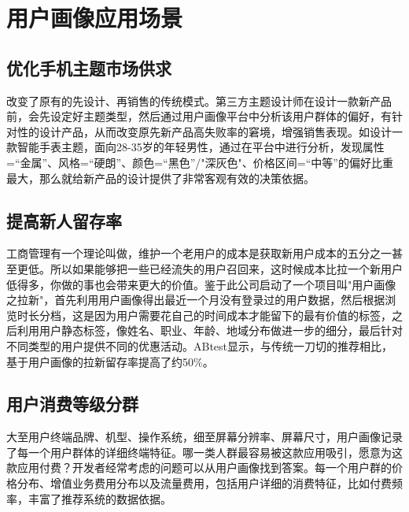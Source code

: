         \begin{figure}
        \centering
          \label{pic:hl_usergroup}
        \end{figure}


    \section{用户画像应用场景}
      \subsection{优化手机主题市场供求}
      改变了原有的先设计、再销售的传统模式。第三方主题设计师在设计一款新产品前，会先设定好主题类型，然后通过用户画像平台中分析该用户群体的偏好，有针对性的设计产品，从而改变原先新产品高失败率的窘境，增强销售表现。如设计一款智能手表主题，面向28-35岁的年轻男性，通过在平台中进行分析，发现属性=“金属”、风格=“硬朗”、颜色=“黑色”/"深灰色"、价格区间=“中等”的偏好比重最大，那么就给新产品的设计提供了非常客观有效的决策依据。
      \subsection{提高新人留存率}
      工商管理有一个理论叫做，维护一个老用户的成本是获取新用户成本的五分之一甚至更低。所以如果能够把一些已经流失的用户召回来，这时候成本比拉一个新用户低得多，你做的事也会带来更大的价值。鉴于此公司启动了一个项目叫"用户画像之拉新"，首先利用用户画像得出最近一个月没有登录过的用户数据，然后根据浏览时长分档，这是因为用户需要花自己的时间成本才能留下的最有价值的标签，之后利用用户静态标签，像姓名、职业、年龄、地域分布做进一步的细分，最后针对不同类型的用户提供不同的优惠活动。ABtest显示，与传统一刀切的推荐相比，基于用户画像的拉新留存率提高了约50\%。
      \subsection{用户消费等级分群}
      大至用户终端品牌、机型、操作系统，细至屏幕分辨率、屏幕尺寸，用户画像记录了每一个用户群体的详细终端特征。哪一类人群最容易被这款应用吸引，愿意为这款应用付费？开发者经常考虑的问题可以从用户画像找到答案。每一个用户群的价格分布、增值业务费用分布以及流量费用，包括用户详细的消费特征，比如付费频率，丰富了推荐系统的数据依据。
